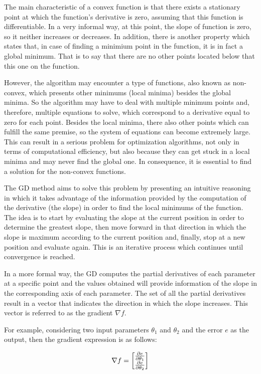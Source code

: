 \documentclass[a4paper, report, oneside, UKenglish]{memoir}
\begin{document}
The main characteristic of a convex function is that there exists a stationary point at which the function's derivative is zero, assuming that this function is differentiable. In a very informal way, at this point, the slope of function is zero, so it neither increases or decreases. In addition, there is another property which states that, in case of finding a minimium point in the function, it is in fact a global minimum. That is to say that there are no other points located below that this one on the function. 

However, the algorithm may encounter a type of functions, also known as non-convex, which presents other minimums (local minima) besides the global minima. So the algorithm may have to deal with multiple minimum points and, therefore, multiple equations to solve, which correspond to a derivative equal to zero for each point. Besides the local minima, there also other points which can fulfill the same premise, so the system of equations can become extremely large. This can result in a serious problem for optimization algorithms, not only in terms of computational efficiency, but also because they can get stuck in a local minima and may never find the global one. In consequence, it is essential to find a solution for the non-convex functions. 

The GD method aims to solve this problem by presenting an intuitive reasoning in which it takes advantage of the information provided by the computation of the derivative (the slope) in order to find the local minimums of the function. 
The idea is to start by evaluating the slope at the current position in order to determine the greatest slope, then move forward in that direction in which the slope is maximum according to the current position and, finally, stop at a new position and evaluate again. This is an iterative process which continues until convergence is reached. 

In a more formal way, the GD computes the partial derivatives of each parameter at a specific point and the values obtained will provide information of the slope in the corresponding axis of each parameter. The set of all the partial derivatives result in a vector that indicates the direction in which the slope increases. This vector is referred to as the gradient $\nabla f$. 

For example, considering two input parameters $\theta_{1}$ and $\theta_{2}$ and the error $e$ as the output, then the gradient expression is as follows:

\begin{equation}
    \nabla f = \begin{bmatrix}
                    \pdv{e}{\theta_{1}} \\
                    \pdv{e}{\theta_{2}} 
                \end{bmatrix}
\end{equation}
\end{document}
